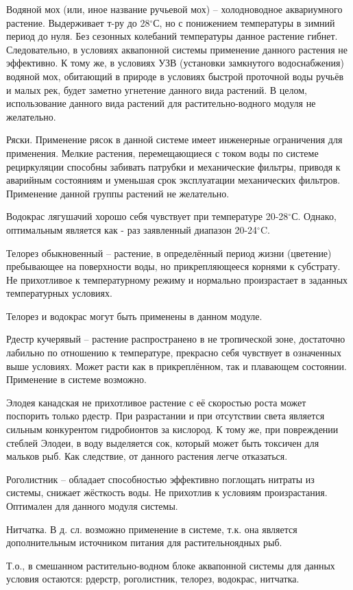 Водяной мох (или, иное название ручьевой мох) – холодноводное аквариумного растение. Выдерживает т-ру до 28$^\circ$С, но с понижением 
температуры в зимний период до нуля. Без сезонных колебаний температуры  данное растение гибнет. Следовательно, в условиях аквапонной 
системы применение данного растения не эффективно. К тому же, в условиях УЗВ (установки замкнутого водоснабжения) водяной мох, 
обитающий в природе в условиях быстрой проточной воды ручьёв и малых рек, будет заметно угнетение данного вида растений. В целом, 
использование данного вида растений для растительно-водного модуля не желательно.

Ряски. Применение рясок в данной системе имеет инженерные ограничения для применения. Мелкие растения, перемещающиеся с током воды по 
системе рециркуляции способны забивать патрубки и механические фильтры, приводя к аварийным состояниям и уменьшая срок эксплуатации механических фильтров. Применение данной группы растений не желательно. 

Водокрас лягушачий хорошо себя чувствует при температуре 20-28$^\circ$С. Однако, оптимальным является как - раз заявленный диапазон 
20-24$^\circ$C. 

Телорез обыкновенный – растение, в определённый период жизни (цветение) пребывающее на поверхности воды, 
но прикрепляющееся корнями к субстрату. Не прихотливое к температурному режиму и нормально произрастает в заданных температурных условиях.

Телорез и водокрас могут быть применены в данном модуле.

Рдестр кучерявый – растение распространено в не тропической зоне, достаточно лабильно по отношению к температуре, 
прекрасно себя чувствует в означенных выше условиях. Может расти как в прикреплённом, так и плавающем состоянии. Применение в системе возможно.

Элодея канадская не прихотливое растение с её скоростью роста может поспорить только рдестр. При разрастании и при отсутствии света является 
сильным конкурентом гидробионтов за кислород. К тому же, при повреждении стеблей Элодеи, в воду выделяется сок, который может быть 
токсичен для мальков рыб. Как следствие, от данного растения легче отказаться.

Роголистник – обладает способностью эффективно поглощать нитраты из системы, снижает жёсткость воды. Не прихотлив к условиям произрастания. 
Оптимален для данного модуля системы.

Нитчатка. В д. сл. возможно применение в системе, т.к. она является дополнительным источником питания для растительноядных рыб.

Т.о., в смешанном растительно-водном блоке аквапонной системы для данных условия остаются: рдерстр, роголистник, телорез, водокрас, нитчатка.

